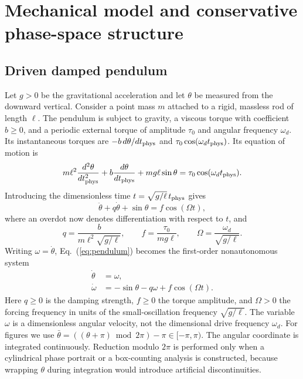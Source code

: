 \documentclass[aps,prb,reprint,floatfix]{revtex4-2}
\begin{document}
\section{Mechanical model and conservative phase-space structure}
\label{sec:model}

\subsection{Driven damped pendulum}

Let $g>0$ be the gravitational acceleration and let $\theta$ be measured from the downward vertical. Consider a point mass $m$ attached to a rigid, massless rod of length $\ell$. The pendulum is subject to gravity, a viscous torque with coefficient $b\geq0$, and a periodic external torque of amplitude $\tau_0$ and angular frequency $\omega_d$. Its instantaneous torques are $-b\,d\theta/dt_{\rm phys}$ and $\tau_0\cos(\omega_d t_{\rm phys})$. Its equation of motion is
\begin{equation}
 m\ell^2\frac{d^2\theta}{dt_{\rm phys}^2}
 +b\frac{d\theta}{dt_{\rm phys}}
 +mg\ell\sin\theta
 =\tau_0\cos(\omega_d t_{\rm phys}).
\label{eq:physical}
\end{equation}
Introducing the dimensionless time $t=\sqrt{g/\ell}\,t_{\rm phys}$ gives
\begin{equation}
 \ddot\theta+q\dot\theta+\sin\theta=f\cos(\Omega t),
\label{eq:pendulum}
\end{equation}
where an overdot now denotes differentiation with respect to $t$, and
\begin{equation}
 q=\frac{b}{m\ell^2\sqrt{g/\ell}},\qquad
 f=\frac{\tau_0}{mg\ell},\qquad
 \Omega=\frac{\omega_d}{\sqrt{g/\ell}}.
\label{eq:dimensionlessparameters}
\end{equation}
Writing $\omega=\dot\theta$, Eq.~(\ref{eq:pendulum}) becomes the first-order nonautonomous system
\begin{align}
 \dot\theta&=\omega,\label{eq:firstorder1}\\
 \dot\omega&=-\sin\theta-q\omega+f\cos(\Omega t).\label{eq:firstorder2}
\end{align}
Here $q\geq0$ is the damping strength, $f\geq0$ the torque amplitude, and $\Omega>0$ the forcing frequency in units of the small-oscillation frequency $\sqrt{g/\ell}$. The variable $\omega$ is a dimensionless angular velocity, not the dimensional drive frequency $\omega_d$. For figures we use $\bar\theta=((\theta+\pi)\bmod 2\pi)-\pi\in[-\pi,\pi)$.
The angular coordinate is integrated continuously. Reduction modulo $2\pi$ is performed only when a cylindrical phase portrait or a box-counting analysis is constructed, because wrapping $\theta$ during integration would introduce artificial discontinuities.
\end{document}

